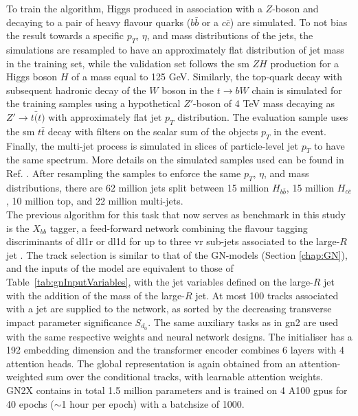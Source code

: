 To train the algorithm, Higgs produced in association with a $Z$-boson and decaying to a pair of heavy flavour quarks ($b\bar{b}$ or a $c\bar{c}$) are simulated. To not bias the result towards a specific $p_T$, $\eta$, and mass distributions of the jets, the simulations are resampled to have an approximately flat distribution of jet mass in the training set, while the validation set follows the \gls{sm} $ZH$ production for a Higgs boson $H$ of a mass equal to 125 GeV. Similarly, the top-quark decay with subsequent hadronic decay of the $W$ boson in the $t \rightarrow bW$ chain is simulated for the training samples using a hypothetical $Z'$-boson of 4 TeV mass decaying as $Z' \rightarrow t\bar(t)$ with approximately flat jet $p_T$ distribution. The evaluation sample uses the \gls{sm} $t\bar{t}$ decay with filters on the scalar sum of the objects $p_T$ in the event. Finally, the multi-jet process is simulated in slices of particle-level jet $p_T$ to have the same spectrum. More details on the simulated samples used can be found in Ref. \cite{ATL-PHYS-PUB-2023-021}. After resampling the samples to enforce the same $p_T$, $\eta$, and mass distributions, there are 62 million jets split between 15 million $H_{b\bar{b}}$, 15 million $H_{c\bar{c}}$, 10 million top, and 22 million multi-jets. \\

The previous algorithm for this task that now serves as benchmark in this study is the $X_{bb}$ tagger, a feed-forward network combining the flavour tagging discriminants of \gls{dl1r} or \gls{dl1d} for up to three \gls{vr} sub-jets associated to the large-$R$ jet \cite{ATL-PHYS-PUB-2020-019, ATL-PHYS-PUB-2021-035}. The track selection is similar to that of the GN-models (Section \ref{chap:GN}), and the inputs of the model are equivalent to those of Table~\ref{tab:gnInputVariables}, with the jet variables defined on the large-$R$ jet with the addition of the mass of the large-$R$ jet. At most 100 tracks associated with a jet are supplied to the network, as sorted by the decreasing transverse impact parameter significance $S_{d_0}$. The same auxiliary tasks as in \gls{gn2} are used with the same respective weights and neural network designs. The initialiser has a 192 embedding dimension and the transformer encoder combines 6 layers with 4 attention heads. The global representation is again obtained from an attention-weighted sum over the conditional tracks, with learnable attention weights. GN2X contains in total 1.5 million parameters and is trained on 4 A100 \glspl{gpu} for 40 epochs ($\sim$1 hour per epoch) with a batchsize of 1000. 

